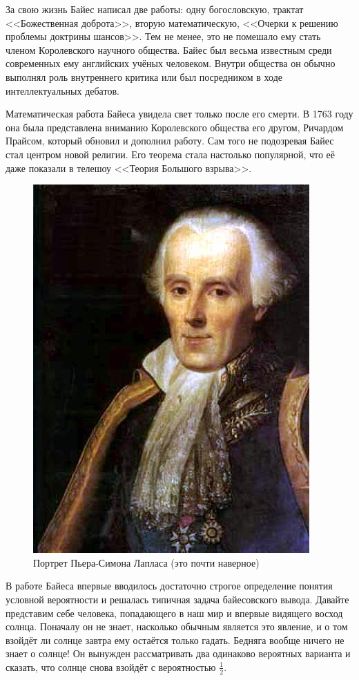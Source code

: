 За свою жизнь Байес написал две работы: одну богословскую, трактат <<Божественная доброта>>, вторую математическую, <<Очерки к решению проблемы доктрины шансов>>. Тем не менее, это не помешало ему стать членом Королевского научного общества. Байес был весьма известным среди современных ему английских учёных человеком. Внутри общества он обычно выполнял роль внутреннего критика или был посредником в ходе интеллектуальных дебатов.

Математическая работа Байеса увидела свет только после его смерти. В 1763 году она была представлена вниманию Королевского общества его другом, Ричардом Прайсом, который обновил и дополнил работу. Сам того не подозревая Байес стал центром новой религии. Его теорема стала настолько популярной, что её даже показали в телешоу <<Теория Большого взрыва>>.

\begin{figure}
	\centering \includegraphics[width=0.8\linewidth]{images/laplas.jpg}
	\caption{Портрет Пьера-Симона Лапласа (это почти наверное)}
\end{figure}

В работе Байеса впервые вводилось достаточно строгое определение понятия условной вероятности и решалась типичная задача байесовского вывода. Давайте представим себе человека, попадающего в наш мир и впервые видящего восход солнца. Поначалу он не знает, насколько обычным является это явление, и о том взойдёт ли солнце завтра ему остаётся только гадать. Бедняга вообще ничего не знает о солнце! Он вынужден рассматривать два одинаково вероятных варианта и сказать, что солнце снова взойдёт с вероятностью $\frac{1}{2}$.

